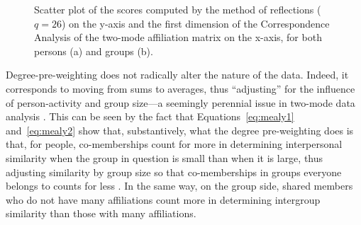 \documentclass[a4paper,fleqn]{cas-sc}
\begin{document}
\begin{figure}
\begin{subfigure}[b]{0.45\textwidth}
            \caption{}
            \label{fig:g-ca-ref}
    \end{subfigure}
    \caption{Scatter plot of the scores computed by the method of reflections ($q = 26$) on the y-axis and the first dimension of the Correspondence Analysis of the two-mode affiliation matrix on the x-axis, for both persons (a) and groups (b). }
    \label{fig:ca-ref-corr}
\end{figure}

Degree-pre-weighting does not radically alter the nature of the data. Indeed, it corresponds to moving from sums to averages, thus ``adjusting'' for the influence of person-activity and group size---a seemingly perennial issue in two-mode data analysis \citep[159ff]{bonacich1991simultaneous}. This can be seen by the fact that Equations~\ref{eq:mealy1} and~\ref{eq:mealy2} show that, substantively, what the degree pre-weighting does is that, for people, co-memberships count for more in determining interpersonal similarity when the group in question is small than when it is large, thus adjusting similarity by group size so that co-memberships in groups everyone belongs to counts for less \citep{ragozini2014correspondence}. In the same way, on the group side, shared members who do not have many affiliations count more in determining intergroup similarity than those with many affiliations. 

\end{document}
